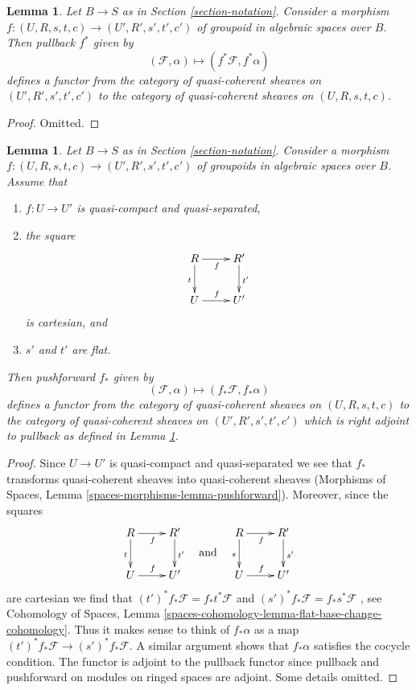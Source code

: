 \documentclass{stacks-project}
\theoremstyle{plain}
\newtheorem{lemma}[subsection]{Lemma}
\theoremstyle{definition}
\theoremstyle{remark}
\numberwithin{equation}{subsection}
\begin{document}
\begin{lemma}
\label{lemma-pullback}
Let $B \to S$ as in Section \ref{section-notation}.
Consider a morphism
$f : (U, R, s, t, c) \to (U', R', s', t', c')$
of groupoid in algebraic spaces over $B$. Then pullback $f^*$ given by
$$
(\mathcal{F}, \alpha) \mapsto (f^*\mathcal{F}, f^*\alpha)
$$
defines a functor from the category of quasi-coherent sheaves on
$(U', R', s', t', c')$ to the category of quasi-coherent sheaves on
$(U, R, s, t, c)$.
\end{lemma}

\begin{proof}
Omitted.
\end{proof}

\begin{lemma}
\label{lemma-pushforward}
Let $B \to S$ as in Section \ref{section-notation}.
Consider a morphism
$f : (U, R, s, t, c) \to (U', R', s', t', c')$
of groupoids in algebraic spaces over $B$. Assume that
\begin{enumerate}
\item $f : U \to U'$ is quasi-compact and quasi-separated,
\item the square
$$
\xymatrix{
R \ar[d]_t \ar[r]_f & R' \ar[d]^{t'} \\
U \ar[r]^f & U'
}
$$
is cartesian, and
\item $s'$ and $t'$ are flat.
\end{enumerate}
Then pushforward $f_*$ given by
$$
(\mathcal{F}, \alpha) \mapsto (f_*\mathcal{F}, f_*\alpha)
$$
defines a functor from the category of quasi-coherent sheaves on
$(U, R, s, t, c)$ to the category of quasi-coherent sheaves on
$(U', R', s', t', c')$ which is right adjoint to pullback as defined in
Lemma \ref{lemma-pullback}.
\end{lemma}

\begin{proof}
Since $U \to U'$ is quasi-compact and quasi-separated we see that
$f_*$ transforms quasi-coherent sheaves into quasi-coherent sheaves
(Morphisms of Spaces, Lemma \ref{spaces-morphisms-lemma-pushforward}).
Moreover, since the squares
$$
\vcenter{
\xymatrix{
R \ar[d]_t \ar[r]_f & R' \ar[d]^{t'} \\
U \ar[r]^f & U'
}
}
\quad\text{and}\quad
\vcenter{
\xymatrix{
R \ar[d]_s \ar[r]_f & R' \ar[d]^{s'} \\
U \ar[r]^f & U'
}
}
$$
are cartesian we find that $(t')^*f_*\mathcal{F} = f_*t^*\mathcal{F}$
and $(s')^*f_*\mathcal{F} = f_*s^*\mathcal{F}$ , see
Cohomology of Spaces, Lemma
\ref{spaces-cohomology-lemma-flat-base-change-cohomology}.
Thus it makes sense to think of $f_*\alpha$ as a map
$(t')^*f_*\mathcal{F} \to (s')^*f_*\mathcal{F}$. A similar argument
shows that $f_*\alpha$ satisfies the cocycle condition.
The functor is adjoint to the pullback functor since pullback
and pushforward on modules on ringed spaces are adjoint.
Some details omitted.
\end{proof}
\end{document}
